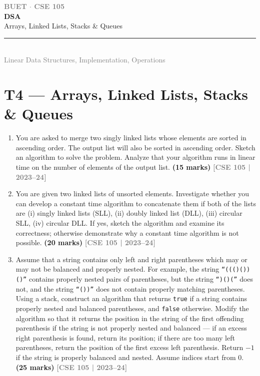 \documentclass[12pt,a3paper]{article}
\newcommand{\yr}[1]{\hfill\textcolor{gray}{\small\textbf{[#1]}}}
\newcommand{\mk}[1]{\textcolor{orange!70!black}{\small\textbf{(#1 marks)}}}
\newcommand{\secdivider}[4]{%
  \newpage\thispagestyle{empty}%
  \vspace*{\fill}%
  \begin{tcolorbox}[enhanced,colback=#4!7,colframe=#3,boxrule=1.5pt,arc=8pt,
    left=20pt,right=20pt,top=22pt,bottom=22pt,
    shadow={3pt}{-3pt}{0pt}{black!15}]
    \centering
    {\large\textcolor{gray}{\textbf{BUET $\cdot$ CSE 105}}}\\[8pt]
    {\fontsize{26}{32}\selectfont\bfseries\textcolor{#3}{DSA}}\\[6pt]
    {\fontsize{15}{19}\selectfont\textcolor{dgray}{#1}}\\[12pt]
    \textcolor{#3!60}{\rule{0.5\textwidth}{0.5pt}}\\[6pt]
    {\small\textcolor{gray}{#2}}
  \end{tcolorbox}%
  \vspace*{\fill}\newpage%
}
\begin{document}
\secdivider{Arrays, Linked Lists, Stacks \& Queues}{Linear Data Structures, Implementation, Operations}{cD}{cD}
\label{sec:T4}
\section{T4 --- Arrays, Linked Lists, Stacks \& Queues}

\begin{enumerate}
\item You are asked to merge two singly linked lists whose elements are sorted in ascending order. The output list will also be sorted in ascending order. Sketch an algorithm to solve the problem. Analyze that your algorithm runs in linear time on the number of elements of the output list. \mk{15}
\yr{CSE 105 | 2023--24}


\item You are given two linked lists of unsorted elements. Investigate whether you can develop a constant time algorithm to concatenate them if both of the lists are (i) singly linked lists (SLL), (ii) doubly linked list (DLL), (iii) circular SLL, (iv) circular DLL. If yes, sketch the algorithm and examine its correctness; otherwise demonstrate why a constant time algorithm is not possible. \mk{20}
\yr{CSE 105 | 2023--24}

\item Assume that a string contains only left and right parentheses which may or may not be balanced and properly nested. For example, the string \texttt{``((()())()''} contains properly nested pairs of parentheses, but the string \texttt{``)()(''} does not, and the string \texttt{``())''} does not contain properly matching parentheses. Using a stack, construct an algorithm that returns \texttt{true} if a string contains properly nested and balanced parentheses, and \texttt{false} otherwise. Modify the algorithm so that it returns the position in the string of the first offending parenthesis if the string is not properly nested and balanced --- if an excess right parenthesis is found, return its position; if there are too many left parentheses, return the position of the first excess left parenthesis. Return $-1$ if the string is properly balanced and nested. Assume indices start from 0. \mk{25}
\yr{CSE 105 | 2023--24}


\end{enumerate}
\end{document}
